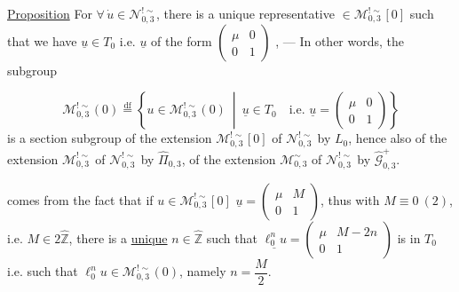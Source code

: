 \uline{Proposition} For $\forall\,\dot u\in\mathcal N_{0,3}^{!\sim}$, there is a unique representative  $\in\mathcal M_{0,3}^{!\sim}[0]$ such that we have $\underline u\in T_0$ i.e. $\underline u$ of the form $\begin{pmatrix}\mu&0\\0&1\end{pmatrix}$
\inserted{[i.e. $\xi=\begin{pmatrix}A&B\\C&D\end{pmatrix}$ of the form $\begin{pmatrix}A&0\\C&D\end{pmatrix}=\begin{pmatrix}\unsure{\ast|\frac{1}{D}}&0\\1-D&D\end{pmatrix}$]}, --- In other words, the subgroup


\[
\mathcal M_{0,3}^{!\sim}(0)\overset{\mathrm{df}}=
\left\{u\in\mathcal M_{0,3}^{!\sim}(0)\ \middle|\ \underline u\in T_0\quad\text{i.e. }\underline u=\begin{pmatrix}\mu&0\\0&1\end{pmatrix}\right\}
\tag{179}
\]
is a section subgroup of the extension $\mathcal M_{0,3}^{!\sim}[0]$ of $\mathcal N_{0,3}^{!\sim}$ by $L_0$, hence also of the extension $\mathcal M_{0,3}^{!\sim}$ of $\mathcal N_{0,3}^{!\sim}$ by $\widehat\Pi_{0,3}$,  of the extension $\mathcal M_{0,3}^{\sim}$ of $\mathcal N_{0,3}^{!\sim}$ by $\widehat{\mathcal G}_{0,3}^{+}$.

 comes from the fact that if $u\in\mathcal M_{0,3}^{!\sim}[0]$  $\underline u=\begin{pmatrix}\mu&M\\0&1\end{pmatrix}$, thus with $M\equiv0\ (2)$, i.e. $M\in2\widehat{\mathbb Z}$, there is a \uline{unique} $n\in\widehat{\mathbb Z}$ such that $\underline{\ell_0^n u}=\begin{pmatrix}\mu&M-2n\\0&1\end{pmatrix}$ is in $T_0$ i.e. such that $\ell_0^n u\in\mathcal M_{0,3}^{!\sim}(0)$, namely $n=\dfrac M2$.

